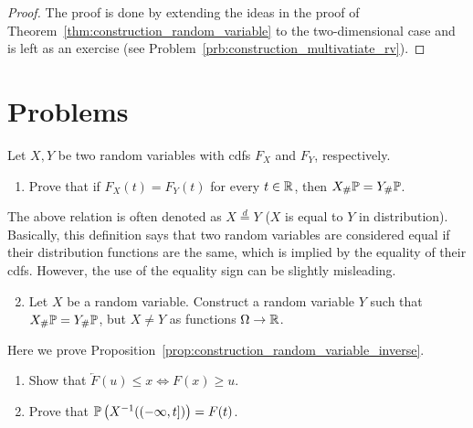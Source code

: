 \begin{proof}
The proof is done by extending the ideas in the proof of Theorem~\ref{thm:construction_random_variable} to the two-dimensional case and is left as an exercise (see Problem~\ref{prb:construction_multivatiate_rv}).
\end{proof}

\section{Problems}

\begin{problem}
Let $X,Y$ be two random variables with cdfs $F_X$ and $F_Y$, respectively. 
\begin{enumerate}[label=(\alph*)]
\item Prove that if $F_X(t) = F_Y(t)$ for every $t \in \mathbb R$, then $X_\# \mathbb P = Y_\# \mathbb P$. 
\end{enumerate}
The above relation is often denoted as $X \stackrel{d}{=} Y$ ($X$ is equal to $Y$ in distribution). Basically, this definition says that two random variables are considered equal if their distribution functions are the same, which is implied by the equality of their cdfs. However, the use of the equality sign can be slightly misleading.
\begin{enumerate}[label=(\alph*)]
\setcounter{enumi}{1}
\item Let $X$ be a random variable. Construct a random variable $Y$ such that $X_\# \mathbb P = Y_\# \mathbb P$, but $X \ne Y$ as functions $\Omega \to \mathbb R$.
\end{enumerate}
\end{problem}


\begin{problem}\label{prb:construction_random_variable_inverse}
Here we prove Proposition~\ref{prop:construction_random_variable_inverse}. 
\begin{enumerate}[label=(\alph*)]
\item Show that $\overleftarrow{F}(u) \le x \iff F(x) \ge u$.
\item Prove that $\mathbb P\left(X^{-1}((-\infty,t])\right) = F(t)$.
\end{enumerate}
\end{problem}

